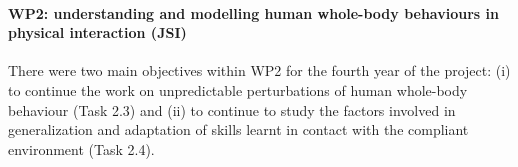 \paragraph{WP2: understanding and modelling human whole-body behaviours in physical interaction (JSI)}

There were two main objectives within WP2 for the fourth year of the project: (i) to continue the work on unpredictable perturbations of human whole-body behaviour (Task 2.3) and (ii) to continue to study the factors involved in generalization and adaptation of skills learnt in contact with the compliant environment (Task 2.4).\\